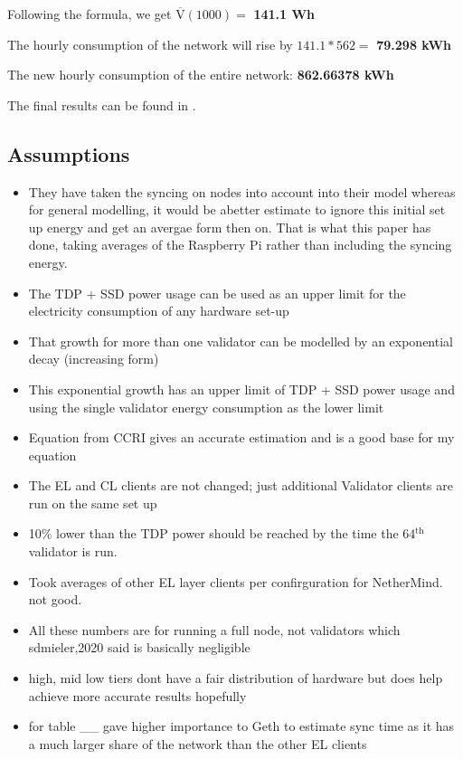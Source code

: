 Following the formula, we get $\boldsymbol{\mathrm{\overline{V}(\mathrm{1000})}} =$ \textbf{141.1 Wh}

The hourly consumption of the network will rise by $141.1 * 562 = $ \textbf{79.298 kWh}

The new hourly consumption of the entire network: \textbf{862.66378 kWh} 

The final results can be found in .


\subsection{Assumptions}

\begin{itemize}
    \item They have taken the syncing on nodes into account into their model whereas for general modelling, it would be  abetter estimate to ignore this initial set up energy and get an avergae form then on. That is what this paper has done, taking averages of the Raspberry Pi rather than including the syncing energy.
    \item The TDP + SSD power usage can be used as an upper limit for the electricity consumption of any hardware set-up
    \item That growth for more than one validator can be modelled by an exponential decay (increasing form)
    \item This exponential growth has an upper limit of TDP + SSD power usage and using the single validator energy consumption as the lower limit
    \item Equation from CCRI gives an accurate estimation and is a good base for my equation
    \item The EL and CL clients are not changed; just additional Validator clients are run on the same set up
    \item 10\% lower than the TDP power should be reached by the time the 64$^\mathrm{{th}}$ validator is run.
    \item Took averages of other EL layer clients per confirguration for NetherMind. not good.
    \item All these numbers are for running a full node, not validators which sdmieler,2020 said is basically negligible
    \item high, mid low tiers dont have a fair distribution of hardware but does help achieve more accurate results hopefully
    \item for table \_\_ gave higher importance to Geth to estimate sync time as it has a much larger share of the network than the other EL clients
\end{itemize}

